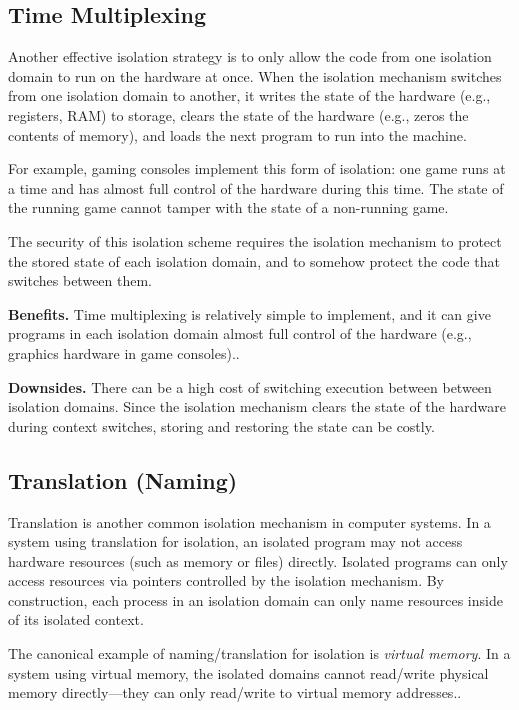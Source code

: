 \documentclass[
  letterpaper,
]{scrbook}
\theoremstyle{definition}
\theoremstyle{plain}
\theoremstyle{plain}
\theoremstyle{remark}
\begin{document}
\subsection{Time Multiplexing}\label{time-multiplexing}

Another effective isolation strategy is to only allow the code from one
isolation domain to run on the hardware at once. When the isolation
mechanism switches from one isolation domain to another, it writes the
state of the hardware (e.g., registers, RAM) to storage, clears the
state of the hardware (e.g., zeros the contents of memory), and loads
the next program to run into the machine.

For example, gaming consoles implement this form of isolation: one game
runs at a time and has almost full control of the hardware during this
time. The state of the running game cannot tamper with the state of a
non-running game.

The security of this isolation scheme requires the isolation mechanism
to protect the stored state of each isolation domain, and to somehow
protect the code that switches between them.

\textbf{Benefits.} Time multiplexing is relatively simple to implement,
and it can give programs in each isolation domain almost full control of
the hardware (e.g., graphics hardware in game consoles)..

\textbf{Downsides.} There can be a high cost of switching execution
between between isolation domains. Since the isolation mechanism clears
the state of the hardware during context switches, storing and restoring
the state can be costly.

\subsection{Translation (Naming)}\label{translation-naming}

Translation is another common isolation mechanism in computer systems.
In a system using translation for isolation, an isolated program may not
access hardware resources (such as memory or files) directly. Isolated
programs can only access resources via pointers controlled by the
isolation mechanism. By construction, each process in an isolation
domain can only name resources inside of its isolated context.

The canonical example of naming/translation for isolation is
\emph{virtual memory}. In a system using virtual memory, the isolated
domains cannot read/write physical memory directly---they can only
read/write to virtual memory addresses..
\end{document}
